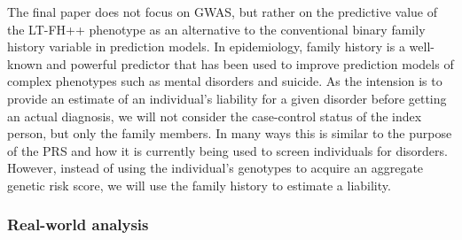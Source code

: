 The final paper does not focus on GWAS, but rather on the predictive value of the LT-FH++ phenotype as an alternative to the conventional binary family history variable in prediction models. In epidemiology, family history is a well-known and powerful predictor that has been used to improve prediction models of complex phenotypes such as mental disorders and suicide. As the intension is to provide an estimate of an individual's liability for a given disorder before getting an actual diagnosis, we will not consider the case-control status of the index person, but only the family members. In many ways this is similar to the purpose of the PRS and how it is currently being used to screen individuals for disorders. However, instead of using the individual's genotypes to acquire an aggregate genetic risk score, we will use the family history to estimate a liability. 

\subsubsection{Real-world analysis}

